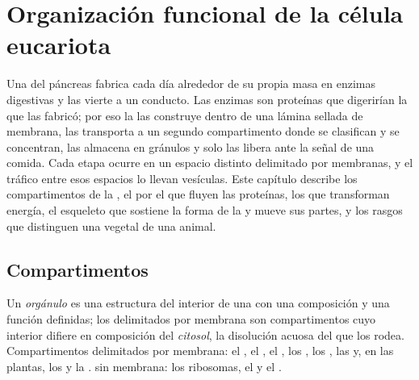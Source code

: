 \chapter{Organización funcional de la célula eucariota}\label{ch:b1:eukaryotic-cell}

Una  del páncreas fabrica cada día alrededor de su propia masa en
enzimas digestivas y las vierte a un conducto. Las enzimas son proteínas que
digerirían la  que las fabricó; por eso la  las construye dentro
de una lámina sellada de membrana, las transporta a un segundo compartimento
donde se clasifican y se concentran, las almacena en gránulos y solo las
libera ante la señal de una comida. Cada etapa ocurre en un espacio distinto
delimitado por membranas, y el tráfico entre esos espacios lo llevan
vesículas. Este capítulo describe los compartimentos de la ,
el  por el que fluyen las proteínas, los  que
transforman energía, el esqueleto que sostiene la forma de la  y mueve
sus partes, y los rasgos que distinguen una  vegetal de una animal.

\section{Compartimentos}

\begin{definition}\label{def:b1:eukaryotic-cell:organelle}
Un \emph{orgánulo} es una estructura del interior de una
 con una composición y una función definidas; los 
delimitados por membrana son compartimentos cuyo interior difiere en
composición del \emph{citosol}, la disolución acuosa del
 que los rodea. Compartimentos delimitados por membrana: el
, el , el , los , los
, las  y, en las plantas, los  y la .
 sin membrana: los ribosomas, el  y el .
\end{definition}

